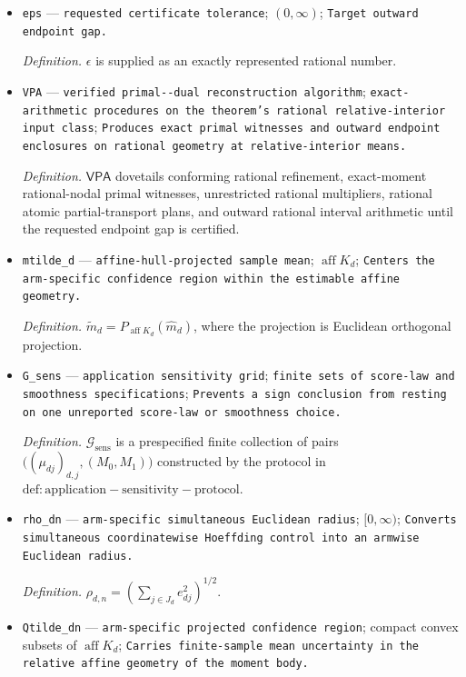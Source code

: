 \documentclass{article}
\begin{document}
\begin{itemize}
  \item \texttt{eps} --- \texttt{requested certificate tolerance}; \((0,\infty)\); \texttt{Target outward endpoint gap.}
  \par\smallskip\noindent\emph{Definition.} \(\epsilon\) is supplied as an exactly represented rational number.
  \item \texttt{VPA} --- \texttt{verified primal-\allowbreak{}-\allowbreak{}dual reconstruction algorithm}; \texttt{exact-\allowbreak{}arithmetic procedures on the theorem's rational relative-\allowbreak{}interior input class}; \texttt{Produces exact primal witnesses and outward endpoint enclosures on rational geometry at relative-\allowbreak{}interior means.}
  \par\smallskip\noindent\emph{Definition.} \(\mathsf{VPA}\) dovetails conforming rational refinement, exact-moment rational-nodal primal witnesses, unrestricted rational multipliers, rational atomic partial-transport plans, and outward rational interval arithmetic until the requested endpoint gap is certified.
  \item \texttt{mtilde\_\allowbreak{}d} --- \texttt{affine-\allowbreak{}hull-\allowbreak{}projected sample mean}; \(\operatorname{aff}K_d\); \texttt{Centers the arm-\allowbreak{}specific confidence region within the estimable affine geometry.}
  \par\smallskip\noindent\emph{Definition.} \(\widetilde m_d=P_{\operatorname{aff}K_d}(\widehat m_d)\), where the projection is Euclidean orthogonal projection.
  \item \texttt{G\_\allowbreak{}sens} --- \texttt{application sensitivity grid}; \texttt{finite sets of score-\allowbreak{}law and smoothness specifications}; \texttt{Prevents a sign conclusion from resting on one unreported score-\allowbreak{}law or smoothness choice.}
  \par\smallskip\noindent\emph{Definition.} \(\mathcal G_{\mathrm{sens}}\) is a prespecified finite collection of pairs \(\bigl((\mu_{dj})_{d,j},(M_0,M_1)\bigr)\) constructed by the protocol in \(\mathrm{def:application-sensitivity-protocol}\).
  \item \texttt{rho\_\allowbreak{}dn} --- \texttt{arm-\allowbreak{}specific simultaneous Euclidean radius}; \([0,\infty)\); \texttt{Converts simultaneous coordinatewise Hoeffding control into an armwise Euclidean radius.}
  \par\smallskip\noindent\emph{Definition.} \(\rho_{d,n}=(\sum_{j\in J_d}e_{dj}^2)^{1/2}\).
  \item \texttt{Qtilde\_\allowbreak{}dn} --- \texttt{arm-\allowbreak{}specific projected confidence region}; compact convex subsets of \(\operatorname{aff}K_d\); \texttt{Carries finite-\allowbreak{}sample mean uncertainty in the relative affine geometry of the moment body.}

\end{itemize}
\end{document}
